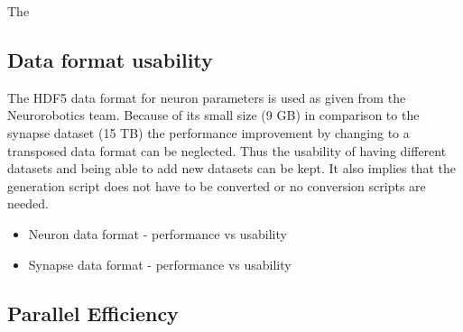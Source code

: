 \documentclass[a4paper]{article}
\begin{document}
The 


\subsection{Data format usability}

The HDF5 data format for neuron parameters is used as given from the Neurorobotics team.
Because of its small size (9 GB) in comparison to the synapse dataset (15 TB) the performance improvement by changing
to a transposed data format can be neglected. Thus the usability of having different datasets and being able
to add new datasets can be kept. It also implies that the generation script does not have to be converted or no 
conversion scripts are needed.

\begin{itemize}
	  \item Neuron data format - performance vs usability
      \item Synapse data format - performance vs usability
\end{itemize}

\subsection{Parallel Efficiency}
\end{document}
